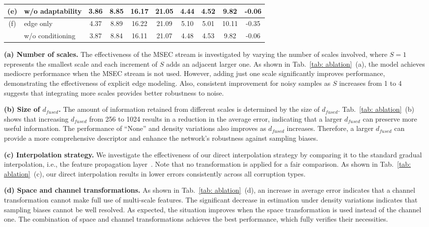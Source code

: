 \documentclass[sigconf]{acmart}
\begin{document}
\begin{table*}[t]
\begin{tabular}{@{}cl|cccc|cc|c|c@{}}
\midrule
\multirow{1}{*}{(e)} & w/o adaptability & 3.86 & 8.85 & 16.17 & 21.05 & 4.44 & 4.52 & 9.82 & -0.06 \\
\midrule
\multirow{2}{*}{(f)} 
& edge only & 4.37 & 8.89 & 16.22 & 21.09 & 5.10 & 5.01 & 10.11 & -0.35\\ 
& w/o conditioning & 3.87 & 8.84 & 16.11 & 21.07 & 4.48 & 4.53 & 9.82 & -0.06\\
                     


   \bottomrule
                     
\end{tabular}
\end{table*}

\indent 

\textbf{(a) Number of scales.}
The effectiveness of the MSEC stream is investigated by varying the number of scales involved, where $S=1$ represents the smallest scale and each increment of $S$ adds an adjacent larger one. As shown in Tab.~\ref{tab: ablation}~(a), the model achieves mediocre performance when the MSEC stream is not used. However, adding just one scale significantly improves performance, demonstrating the effectiveness of explicit edge modeling.
Also, consistent improvement for noisy samples as $S$ increases from 1 to 4 suggests that integrating more scales provides better robustness to noise.

\textbf{(b) Size of $d_{fused}$.} 
The amount of information retained from different scales is determined by the size of $d_{fused}$. Tab.~\ref{tab: ablation}~(b) shows that increasing $d_{fused}$ from 256 to 1024 results in a reduction in the average error, indicating that a larger $d_{fused}$ can preserve more useful information. The performance of ``None'' and density variations also improves as $d_{fused}$ increases. Therefore, a larger $d_{fused}$ can provide a more comprehensive descriptor and enhance the network's robustness against sampling biases.

\textbf{(c) Interpolation strategy.}
We investigate the effectiveness of our direct interpolation strategy by comparing it to the standard gradual interpolation, i.e., the feature propagation layer~\cite{qi2017pointnet++}. Note that no transformation is applied for a fair comparison. As shown in Tab.~\ref{tab: ablation}~(c), our direct interpolation results in lower errors consistently across all corruption types.

\textbf{(d) Space and channel transformations.} 
As shown in Tab.~\ref{tab: ablation}~(d), an increase in average error indicates that a channel transformation cannot make full use of multi-scale features. The significant decrease in estimation under density variations indicates that sampling biases cannot be well resolved. As expected, the situation improves when the space transformation is used instead of the channel one. The combination of space and channel transformations achieves the best performance, which fully verifies their necessities.  
\end{document}
